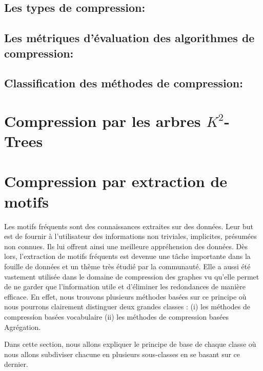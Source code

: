 \documentclass[a4paper,oneside,12pt]{report}
\theoremstyle{definition}
\begin{document}
	
			\subsection{Les types de compression:}
			
			
	
			\subsection{Les métriques d'évaluation des algorithmes de compression:}
				
			
			\subsection{Classification des méthodes de compression:}
				
				
			\section{Compression par les arbres $K^2$-Trees}
				
				
			\section{Compression par extraction de motifs}
			 Les motifs fréquents sont des connaissances extraites sur des données. Leur but est de fournir à l'utilisateur des informations non triviales, implicites, présumées non connues. Ils lui offrent ainsi une meilleure appréhension des données. Dès lors, l'extraction de motifs fréquents est  devenue une tâche importante dans la fouille de données et un thème très étudié par la communauté. Elle a aussi été vastement %
			 utilisée dans le domaine de compression des graphes vu qu'elle permet de ne garder que l'information utile et d'éliminer les redondances de manière efficace. En effet, nous trouvons plusieurs méthodes basées sur ce principe où nous pourrons clairement distinguer deux grandes classes : 
			 (i) les méthodes de compression basées vocabulaire
			 (ii) les méthodes de compression basées Agrégation.
			 
				Dans cette section, nous allons expliquer le principe de base de chaque classe où nous allons subdiviser chacune en plusieurs sous-classes en se basant sur ce dernier. 
			 
\end{document}
